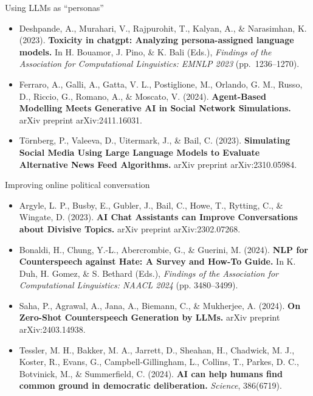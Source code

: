 \documentclass[12pt]{beamer}
\begin{document}
\begin{frame}[c]{Using LLMs as ``personas''}

\scriptsize
\begin{itemize}
\itemsep2em
\item Deshpande, A., Murahari, V., Rajpurohit, T., Kalyan, A., \& Narasimhan, K. (2023). \textbf{Toxicity in chatgpt: Analyzing persona-assigned language models.} In H. Bouamor, J. Pino, \& K. Bali (Eds.), \textit{Findings of the Association for Computational Linguistics: EMNLP 2023} (pp.~1236–1270).

\item Ferraro, A., Galli, A., Gatta, V. L., Postiglione, M., Orlando, G. M., Russo, D., Riccio, G., Romano, A., \& Moscato, V. (2024). \textbf{Agent-Based Modelling Meets Generative AI in Social Network Simulations.} arXiv preprint arXiv:2411.16031.

\item Törnberg, P., Valeeva, D., Uitermark, J., \& Bail, C. (2023). \textbf{Simulating Social Media Using Large Language Models to Evaluate Alternative News Feed Algorithms.} arXiv preprint arXiv:2310.05984.
\end{itemize}


\end{frame}
\begin{frame}[c]{Improving online political conversation}

\scriptsize
\begin{itemize}
\itemsep1em

\item Argyle, L. P., Busby, E., Gubler, J., Bail, C., Howe, T., Rytting, C., \& Wingate, D. (2023). \textbf{AI Chat Assistants can Improve Conversations about Divisive Topics.} arXiv preprint arXiv:2302.07268.

\item Bonaldi, H., Chung, Y.-L., Abercrombie, G., \& Guerini, M. (2024). \textbf{NLP for Counterspeech against Hate: A Survey and How-To Guide.} In K. Duh, H. Gomez, \& S. Bethard (Eds.), \textit{Findings of the Association for Computational Linguistics: NAACL 2024} (pp. 3480–3499).

\item Saha, P., Agrawal, A., Jana, A., Biemann, C., \& Mukherjee, A. (2024). \textbf{On Zero-Shot Counterspeech Generation by LLMs.} arXiv preprint arXiv:2403.14938.

\item Tessler, M. H., Bakker, M. A., Jarrett, D., Sheahan, H., Chadwick, M. J., Koster, R., Evans, G., Campbell-Gillingham, L., Collins, T., Parkes, D. C., Botvinick, M., \& Summerfield, C. (2024). \textbf{AI can help humans find common ground in democratic deliberation.} \textit{Science}, 386(6719).
\end{itemize}

\end{frame}
\end{document}
